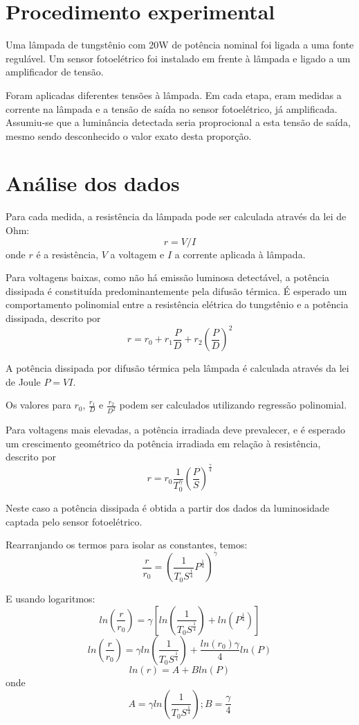 \documentclass[brazilian,12pt,a4paper,final]{article}
\begin{document}
\section{Procedimento experimental}
Uma lâmpada de tungstênio com 20W de potência nominal foi ligada a uma fonte regulável. 
Um sensor fotoelétrico foi instalado em frente à lâmpada e ligado a um amplificador de tensão.

Foram aplicadas diferentes tensões à lâmpada.
Em cada etapa, eram medidas a corrente na lâmpada e a tensão de saída no sensor fotoelétrico, já amplificada.
Assumiu-se que a luminância detectada seria proprocional a esta tensão de saída, mesmo sendo desconhecido o valor exato desta proporção.

\section{Análise dos dados}
Para cada medida, 
a resistência da lâmpada pode ser calculada 
através da lei de Ohm: 
$$ r=V/I$$ 
onde $r$ é a resistência, $V$ a voltagem e $I$ a corrente aplicada à lâmpada. 

Para voltagens baixas,
como não há emissão luminosa detectável, 
a potência dissipada é constituída predominantemente
pela difusão térmica.
É esperado um comportamento polinomial entre a 
resistência elétrica do tungstênio e a potência dissipada, descrito por
$$r=r_0+r_1\frac{P}{D}+r_2(\frac{P}{D})^2$$

A potência dissipada por difusão térmica pela lâmpada é calculada através da 
lei de Joule $ P=VI $.

Os valores para $r_0$, $\frac{r_1}{D}$ e $\frac{r_2}{D^2}$
podem ser calculados
utilizando regressão polinomial.

Para voltagens mais elevadas, 
a potência irradiada deve prevalecer, e
é esperado um crescimento geométrico da 
potência irradiada em relação à resistência, descrito por
$$r=r_0\frac{1}{T_0^\gamma}(\frac{P}{S})^\frac{\gamma}{4}$$

Neste caso a potência dissipada é obtida a partir dos dados da luminosidade captada
pelo sensor fotoelétrico.

Rearranjando os termos para isolar as constantes, temos:
$$\frac{r}{r_0}=(\frac{1}{T_0S^\frac{1}{4}}P^\frac{1}{4})^\gamma$$

E usando logaritmos:
$$ln(\frac{r}{r_0})=\gamma[ln(\frac{1}{T_0S^\frac{1}{4}})+ln(P^\frac{1}{4})]$$
$$ln(\frac{r}{r_0})=\gamma ln(\frac{1}{T_0S^\frac{1}{4}})+\frac{ln(r_0)\gamma}{4}ln(P)$$
$$ln(r)=A+Bln(P)$$
onde
$$A=\gamma ln(\frac{1}{T_0S^\frac{1}{4}}); B=\frac{\gamma}{4}$$
\end{document}
